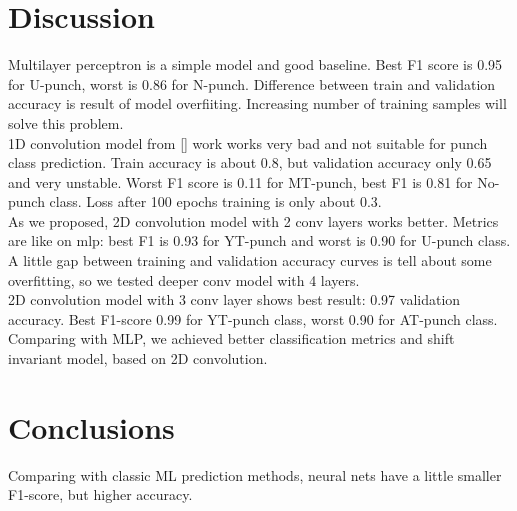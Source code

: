 \documentclass[sport,article,submit,moreauthors,pdftex]{Definitions/mdpi}
\begin{document}

\section{Discussion}
Multilayer perceptron is a simple model and good baseline. Best F1 score is 0.95 for U-punch, worst is 0.86 for N-punch. Difference between train and validation accuracy is result of model overfiiting.
Increasing number of training samples will solve this problem.\\
1D convolution model from [] work works very bad and not suitable for punch class prediction. Train accuracy is about 0.8, but validation accuracy only 0.65 and very unstable. Worst F1 score is 0.11 for MT-punch, best F1 is 0.81 for No-punch class. Loss after 100 epochs training is only about 0.3.\\
As we proposed, 2D convolution model with 2 conv layers works better. Metrics are like on mlp: best F1 is 0.93 for YT-punch and worst is 0.90 for U-punch class. A little gap between training and validation accuracy curves is tell about some overfitting, so we tested deeper conv model with 4 layers.\\
2D convolution model with 3 conv layer shows best result: 0.97 validation accuracy. Best F1-score 0.99 for YT-punch class, worst 0.90 for AT-punch class.\\
Comparing with MLP, we achieved better classification metrics and shift invariant model, based on 2D convolution.

\section{Conclusions}
Comparing with classic ML prediction methods, neural nets have a little smaller F1-score, but higher accuracy.

\vspace{6pt}


\end{document}
